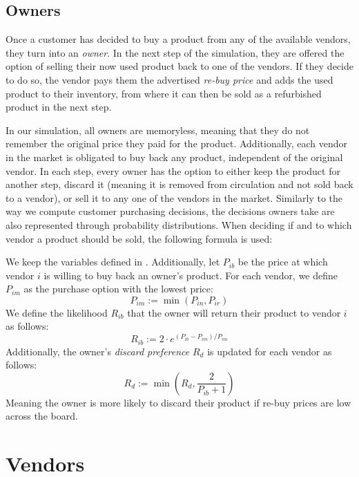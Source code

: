 \subsection*{Owners}

Once a customer has decided to buy a product from any of the available vendors, they turn into an \emph{owner}. In the next step of the simulation, they are offered the option of selling their now used product back to one of the vendors. If they decide to do so, the vendor pays them the advertised \emph{re-buy price} and adds the used product to their inventory, from where it can then be sold as a refurbished product in the next step.

In our simulation, all owners are memoryless, meaning that they do not remember the original price they paid for the product. Additionally, each vendor in the market is obligated to buy back any product, independent of the original vendor. In each step, every owner has the option to either keep the product for another step, discard it (meaning it is removed from circulation and not sold back to a vendor), or sell it to any one of the vendors in the market. Similarly to the way we compute customer purchasing decisions, the decisions owners take are also represented through probability distributions. When deciding if and to which vendor a product should be sold, the following formula is used:

\begin{definition}\label{def:ownerDecisions}
	We keep the variables defined in . Additionally, let \(P_{ib}\) be the price at which vendor \(i\) is willing to buy back an owner's product. For each vendor, we define \(P_{im}\) as the purchase option with the lowest price:
	\[
		P_{im} := \min(P_{in}, P_{ir})
	\]
	We define the likelihood \(R_{ib}\) that the owner will return their product to vendor \(i\) as follows:
	\[
		R_{ib} := 2 \cdot e^{(P_{ib} - P_{im}) / P_{im}}
	\]
	Additionally, the owner's \emph{discard preference} \(R_{d}\) is updated for each vendor as follows:
	\[
		R_{d} := \min({R_{d}, \frac{2}{P_{ib}+1}})
	\]
	Meaning the owner is more likely to discard their product if re-buy prices are low across the board.
\end{definition}

\section{Vendors}\label{sec:ExplainVendors}

